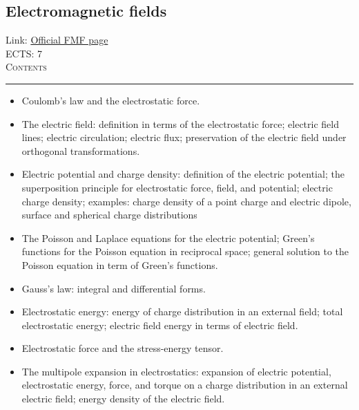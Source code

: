 \documentclass[11pt, a4paper]{article}
\newenvironment{course}[3]{
\subsection{#1}%
Link: \href{#2}{Official FMF page}\\%
ECTS: #3%
\vspace{1ex}
\\
{\large \textsc{Contents}}\\[-0.9ex]%
\rule{\textwidth}{0.5pt}
\vspace{-3ex}
}
{}
\newenvironment{chapter}[1]{
\begin{tcolorbox}[title=#1, breakable]
}
{\end{tcolorbox}}
\begin{document}
\begin{course}{Electromagnetic fields}{https://www.fmf.uni-lj.si/en/study-physics/programmes/1fiz/2020/7000777/courses/1133/}{7}
    \label{electromagnetic-fields}

    \begin{chapter}{Electrostatics}
        \begin{itemize}
            
            \item Coulomb's law and the electrostatic force.

            \item The electric field: definition in terms of the electrostatic force; electric field lines; electric circulation; electric flux; preservation of the electric field under orthogonal transformations.

            \item Electric potential and charge density: definition of the electric potential; the superposition principle for electrostatic force, field, and potential; electric charge density; examples: charge density of a point charge and electric dipole, surface and spherical charge distributions 

            \item The Poisson and Laplace equations for the electric potential; Green's functions for the Poisson equation in reciprocal space; general solution to the Poisson equation in term of Green's functions.

            \item Gauss's law: integral and differential forms.

            \item Electrostatic energy: energy of charge distribution in an external field; total electrostatic energy; electric field energy in terms of electric field.

            \item Electrostatic force and the stress-energy tensor.

            \item The multipole expansion in electrostatics: expansion of electric potential, electrostatic energy, force, and torque on a charge distribution in an external electric field; energy density of the electric field.

        \end{itemize}
    \end{chapter}

    \begin{chapter}{Magnetostatics}


\end{chapter}
\end{course}
\end{document}
